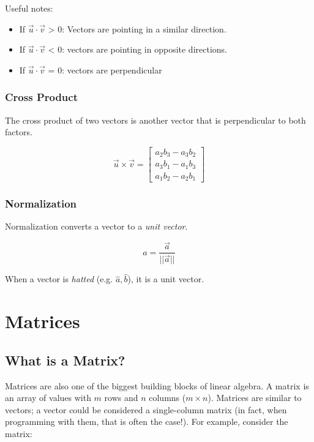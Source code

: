 \documentclass[12pt]{report}
\begin{document}
            Useful notes:

            \begin{itemize}
                \item If $\vec{u} \cdot \vec{v}$ 
                    > 0: Vectors are pointing in a similar direction.
                \item If $\vec{u} \cdot \vec{v}$ 
                    < 0: vectors are pointing in opposite directions.
                \item If $\vec{u} \cdot \vec{v}$ 
                    = 0: vectors are perpendicular
            \end{itemize}

        \subsection{Cross Product}
            The cross product of two vectors is another vector that is perpendicular to both factors.

            \begin{equation}
                \vec{u} \times \vec{v} = \begin{bmatrix} a_2b_3 - a_3b_2 \\ a_3b_1 - a_1b_3 \\ a_1b_2 - a_2b_1 \end{bmatrix}
            \end{equation}

        \subsection{Normalization}
            Normalization converts a vector to a \emph{unit vector}.

            \begin{equation}
                \hat{a} = \frac{\vec{a}}{||\vec{a}||}
            \end{equation}

            When a vector is \emph{hatted} (e.g. $\hat{a}, \hat{b}$), it is a unit vector.

\chapter{Matrices}
    \section{What is a Matrix?}
        Matrices are also one of the biggest building blocks of linear algebra. A matrix is an array of values with $m$ rows and $n$ columns ($m \times n$). Matrices are similar to vectors; a vector could be considered a single-column matrix (in fact, when programming with them, that is often the case!). For example, consider the matrix:
\end{document}

